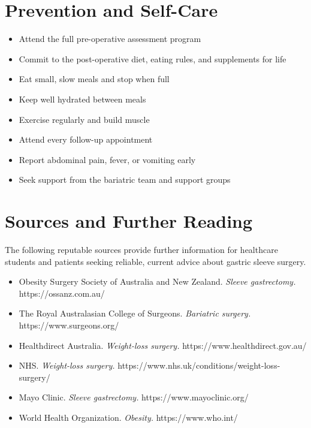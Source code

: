 \section*{Prevention and Self-Care}
\begin{itemize}
    \item Attend the full pre-operative assessment program
    \item Commit to the post-operative diet, eating rules, and supplements for life
    \item Eat small, slow meals and stop when full
    \item Keep well hydrated between meals
    \item Exercise regularly and build muscle
    \item Attend every follow-up appointment
    \item Report abdominal pain, fever, or vomiting early
    \item Seek support from the bariatric team and support groups
\end{itemize}

\section*{Sources and Further Reading}
The following reputable sources provide further information for healthcare students and patients seeking reliable, current advice about gastric sleeve surgery.
\begin{itemize}
    \item Obesity Surgery Society of Australia and New Zealand. \textit{Sleeve gastrectomy.} https://ossanz.com.au/
    \item The Royal Australasian College of Surgeons. \textit{Bariatric surgery.} https://www.surgeons.org/
    \item Healthdirect Australia. \textit{Weight-loss surgery.} https://www.healthdirect.gov.au/
    \item NHS. \textit{Weight-loss surgery.} https://www.nhs.uk/conditions/weight-loss-surgery/
    \item Mayo Clinic. \textit{Sleeve gastrectomy.} https://www.mayoclinic.org/
    \item World Health Organization. \textit{Obesity.} https://www.who.int/
\end{itemize}
